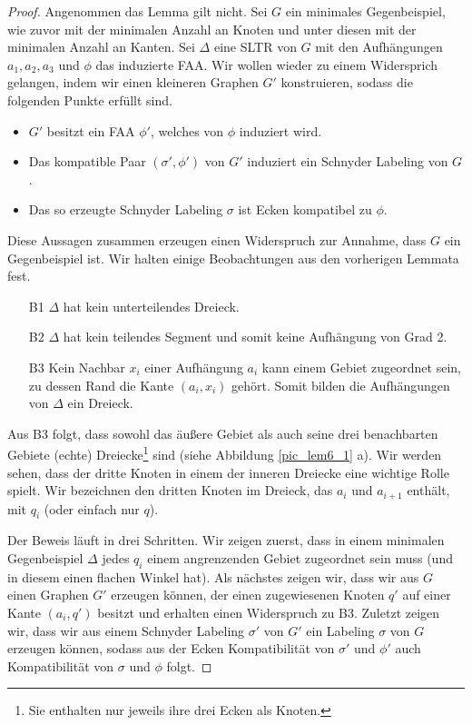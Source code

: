 \begin{proof}
Angenommen das Lemma gilt nicht. Sei $G$ ein minimales Gegenbeispiel, wie zuvor mit der minimalen Anzahl an Knoten und unter diesen mit der minimalen Anzahl an Kanten. Sei $\Delta$ eine SLTR von $G$ mit den Aufhängungen $a_1,a_2,a_3$ und $\phi$ das induzierte FAA. Wir wollen wieder zu einem Widersprich gelangen, indem wir einen kleineren Graphen $G'$ konstruieren, sodass die folgenden Punkte erfüllt sind.
\begin{itemize}
\item $G'$ besitzt ein FAA $\phi'$, welches von $\phi$ induziert wird.
\item Das kompatible Paar $(\sigma',\phi')$ von $G'$ induziert ein Schnyder Labeling von $G$.
\item Das so erzeugte Schnyder Labeling $\sigma$ ist Ecken kompatibel zu $\phi$.
\end{itemize}
Diese Aussagen zusammen erzeugen einen Widerspruch zur Annahme, dass $G$ ein Gegenbeispiel ist. Wir halten einige Beobachtungen aus den vorherigen Lemmata fest.
\begin{itemize}
\item [B1] $\Delta$ hat kein unterteilendes Dreieck.
\item [B2] $\Delta$ hat kein teilendes Segment und somit keine Aufhängung von Grad 2.
\item [B3] Kein Nachbar $x_i$ einer Aufhängung $a_i$ kann einem Gebiet zugeordnet sein, zu dessen Rand die Kante $(a_i,x_i)$ gehört. Somit bilden die Aufhängungen von $\Delta$ ein Dreieck.
\end{itemize}

Aus B3 folgt, dass sowohl das äußere Gebiet als auch seine drei benachbarten Gebiete (echte) Dreiecke\footnote{Sie enthalten nur jeweils ihre drei Ecken als Knoten.} sind (siehe Abbildung \ref{pic_lem6_1} a). Wir werden sehen, dass der dritte Knoten in einem der inneren Dreiecke eine wichtige Rolle spielt. Wir bezeichnen den dritten Knoten im Dreieck, das $a_i$ und $a_{i+1}$ enthält, mit $q_i$ (oder einfach nur $q$).

Der Beweis läuft in drei Schritten. Wir zeigen zuerst, dass in einem minimalen Gegenbeispiel $\Delta$ jedes $q_i$ einem angrenzenden Gebiet zugeordnet sein muss (und in diesem einen flachen Winkel hat). Als nächstes zeigen wir, dass wir aus $G$ einen Graphen $G'$ erzeugen können, der einen zugewiesenen Knoten $q'$ auf einer Kante $(a_i,q')$ besitzt und erhalten einen Widerspruch zu B3. Zuletzt zeigen wir, dass wir aus einem Schnyder Labeling $\sigma'$ von $G'$ ein Labeling $\sigma$ von $G$ erzeugen können, sodass aus der Ecken Kompatibilität von $\sigma'$ und $\phi'$ auch Kompatibilität von $\sigma$ und $\phi$ folgt.


\end{proof}
